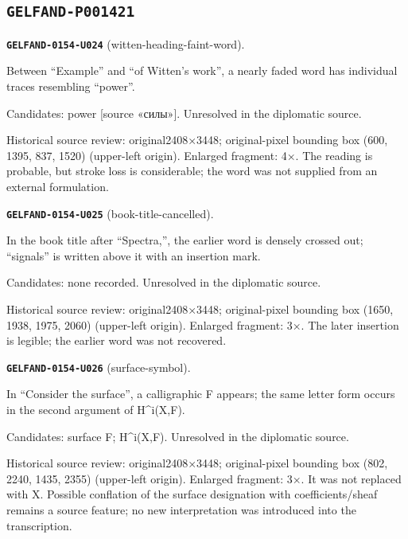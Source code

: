 \subsection*{\texttt{GELFAND-P001421}}
\par\noindent\leavevmode{}\label{GELFAND-0154-U024}\textbf{\texttt{GELFAND-0154-U024}} (witten-heading-faint-word).\nopagebreak[4]\par
Between “Example” and “of Witten’s work”, a nearly faded word has individual traces resembling “power”.\par
Candidates: power [source «силы»]. Unresolved in the diplomatic source.\par
Historical source review: original2408×3448; original-pixel bounding box (600, 1395, 837, 1520) (upper-left origin). Enlarged fragment: 4×. The reading is probable, but stroke loss is considerable; the word was not supplied from an external formulation.\par\medskip
\par\noindent\leavevmode{}\label{GELFAND-0154-U025}\textbf{\texttt{GELFAND-0154-U025}} (book-title-cancelled).\nopagebreak[4]\par
In the book title after “Spectra,”, the earlier word is densely crossed out; “signals” is written above it with an insertion mark.\par
Candidates: none recorded. Unresolved in the diplomatic source.\par
Historical source review: original2408×3448; original-pixel bounding box (1650, 1938, 1975, 2060) (upper-left origin). Enlarged fragment: 3×. The later insertion is legible; the earlier word was not recovered.\par\medskip
\par\noindent\leavevmode{}\label{GELFAND-0154-U026}\textbf{\texttt{GELFAND-0154-U026}} (surface-symbol).\nopagebreak[4]\par
In “Consider the surface”, a calligraphic F appears; the same letter form occurs in the second argument of H\textasciicircum{}i(X,F).\par
Candidates: surface F; H\textasciicircum{}i(X,F). Unresolved in the diplomatic source.\par
Historical source review: original2408×3448; original-pixel bounding box (802, 2240, 1435, 2355) (upper-left origin). Enlarged fragment: 3×. It was not replaced with X. Possible conflation of the surface designation with coefficients/sheaf remains a source feature; no new interpretation was introduced into the transcription.\par\medskip
